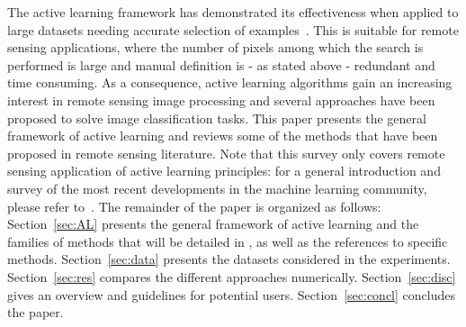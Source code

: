 The active learning framework has demonstrated its effectiveness when applied to large datasets needing accurate selection of examples~. This is suitable for remote sensing applications, where the number of pixels among which the search is performed is large and manual definition is - as stated above - redundant and time consuming.
As a consequence, active learning algorithms gain an increasing interest in remote sensing image processing and several approaches have been proposed to solve image classification tasks. This paper presents the general framework of active learning and reviews some of the methods that have been proposed in remote sensing literature. Note that this survey only covers remote sensing application of active learning principles: for a general introduction and survey of the most recent developments in the machine learning community, please refer to~.
The remainder of the paper is organized as follows: Section~\ref{sec:AL} presents the general framework of active learning and the families of methods that will be detailed in , as well as the references to specific methods. Section~\ref{sec:data} presents the datasets considered in the experiments. Section~\ref{sec:res} compares the different approaches numerically. Section~\ref{sec:disc} gives an overview and guidelines for potential users. Section~\ref{sec:concl} concludes the paper.

